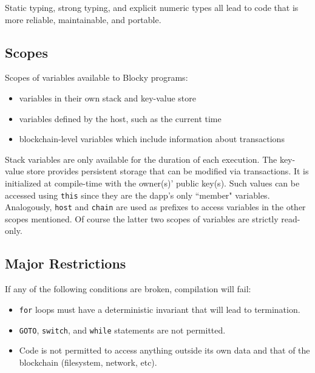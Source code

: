 \documentclass[letterpaper]{article}
\begin{document}
Static typing, strong typing, and explicit numeric types all lead to code that is more reliable, maintainable, and portable. 

\subsection{Scopes}
Scopes of variables available to Blocky programs:
\begin{itemize}
  \item{variables in their own stack and key-value store}
  \item{variables defined by the host, such as the current time}
  \item{blockchain-level variables which include information about transactions}
\end{itemize}
Stack variables are only available for the duration of each execution. The key-value store provides persistent storage that can be modified via transactions. It is initialized at compile-time with the owner(s)' public key(s). Such values can be accessed using \texttt{this} since they are the dapp's only ``member" variables. Analogously, \texttt{host} and \texttt{chain} are used as prefixes to access variables in the other scopes mentioned. Of course the latter two scopes of variables are strictly read-only.

\subsection{Major Restrictions}
If any of the following conditions are broken, compilation will fail:
\begin{itemize}
  \item{\texttt{for} loops must have a deterministic invariant that will lead to termination.}
  \item{\texttt{GOTO}, \texttt{switch}, and \texttt{while} statements are not permitted.}
  \item{Code is not permitted to access anything outside its own data and that of the blockchain (filesystem, network, etc).}
\end{itemize}
\end{document}
